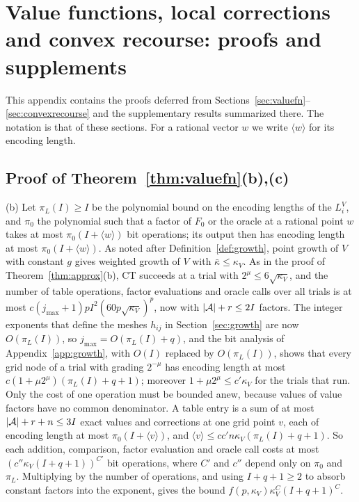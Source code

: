 \section{Value functions, local corrections and convex recourse: proofs and
supplements}\label{app:recourse-convex}

This appendix contains the proofs deferred from
Sections~\ref{sec:valuefn}--\ref{sec:convexrecourse} and the supplementary
results summarized there. The notation is that of these sections. For a
rational vector $w$ we write $\langle w\rangle$ for its encoding length.

\subsection{Proof of Theorem~\ref{thm:valuefn}(b),(c)}

(b) Let $\pi_L(I)\ge I$ be the polynomial bound on the encoding lengths of
the $L_i^V$, and $\pi_0$ the polynomial such that a factor of $F_0$ or the
oracle at a rational point $w$ takes at most $\pi_0(I+\langle w\rangle)$ bit
operations; its output then has encoding length at most
$\pi_0(I+\langle w\rangle)$. As noted after Definition~\ref{def:growth},
point growth of $V$ with constant
$g$ gives weighted growth of $V$ with $\bar\kappa\le\kappa_V$. As in the
proof of Theorem~\ref{thm:approx}(b), CT succeeds at a trial with
$2^\mu\le6\sqrt{\kappa_V}$, and the number of table operations, factor
evaluations and oracle calls over all trials is at most
$c(j_{\max}+1)pI^2(60p\sqrt{\kappa_V})^p$, now with $\lvert \mathcal A\rvert+r\le2I$
factors. The integer exponents that define the meshes $h_{ij}$ in
Section~\ref{sec:growth} are now $O(\pi_L(I))$, so
$j_{\max}=O(\pi_L(I)+q)$, and
the bit analysis of Appendix~\ref{app:growth}, with $O(I)$ replaced by
$O(\pi_L(I))$, shows that
every grid node of a trial with grading $2^{-\mu}$ has encoding length at
most $c(1+\mu2^\mu)(\pi_L(I)+q+1)$; moreover $1+\mu2^\mu\le c'\kappa_V$ for
the trials that run. Only the cost of one operation must be bounded anew,
because values of value factors have no common denominator. A table entry
is a sum of at most $\lvert \mathcal A\rvert+r+n\le3I$ exact values and corrections
at one grid point $v$, each of encoding length at most
$\pi_0(I+\langle v\rangle)$, and $\langle v\rangle\le
cc'n\kappa_V(\pi_L(I)+q+1)$. So each addition, comparison, factor evaluation
and oracle call costs at most $(c''\kappa_V(I+q+1))^{C'}$ bit operations,
where $C'$ and $c''$ depend only on $\pi_0$ and $\pi_L$. Multiplying by the
number of operations, and using $I+q+1\ge2$ to absorb constant factors into
the exponent, gives the bound $f(p,\kappa_V)\kappa_V^C(I+q+1)^C$.

